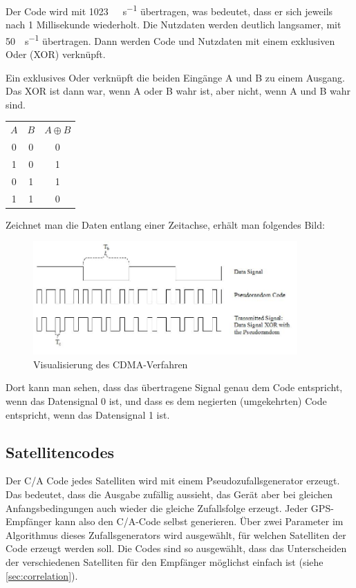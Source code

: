 \documentclass[12pt,a4paper]{scrartcl}
\begin{document}
Der Code wird mit \SI{1023}{\mega\chip\per\second} übertragen, was bedeutet, dass er sich jeweils nach 1 Millisekunde wiederholt.
Die Nutzdaten werden deutlich langsamer, mit \SI{50}{\bit\per\second} übertragen. Dann werden Code und Nutzdaten mit einem exklusiven Oder (XOR) verknüpft.

Ein exklusives Oder verknüpft die beiden Eingänge A und B zu einem Ausgang. Das XOR ist dann war, wenn A oder B wahr ist, aber nicht, wenn A und B wahr sind.

\begin{center}
\begin{tabular}{cc|c}
\textbf{$A$} & \textbf{$B$} & \textbf{$A\oplus B$} \\
0 & 0 & 0 \\
1 & 0 & 1 \\
0 & 1 & 1 \\
1 & 1 & 0 \\
\end{tabular}
\end{center}

Zeichnet man die Daten entlang einer Zeitachse, erhält man folgendes Bild:

\begin{figure}[H]
\centering
\includegraphics[width=0.9\textwidth]{img/Generation_of_CDMA.jpg}
\caption{Visualisierung des CDMA-Verfahren\cite{commons_cdma}}
\label{fig:cdma}
\end{figure}

Dort kann man sehen, dass das übertragene Signal genau dem Code entspricht, wenn das Datensignal 0 ist, und dass es dem negierten (umgekehrten) Code entspricht, wenn das Datensignal 1 ist.

\subsection{Satellitencodes}

Der C/A Code jedes Satelliten wird mit einem Pseudozufallsgenerator erzeugt. Das bedeutet, dass die Ausgabe zufällig aussieht, das Gerät aber bei gleichen Anfangsbedingungen auch wieder die gleiche Zufallsfolge erzeugt. Jeder GPS-Empfänger kann also den C/A-Code selbst generieren. Über zwei Parameter im Algorithmus dieses Zufallsgenerators wird ausgewählt, für welchen Satelliten der Code erzeugt werden soll. Die Codes sind so ausgewählt, dass das Unterscheiden der verschiedenen Satelliten für den Empfänger möglichst einfach ist (siehe \ref{sec:correlation}).
\end{document}
